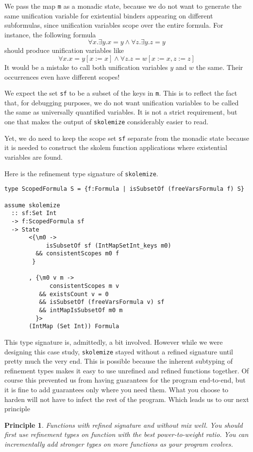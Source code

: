 \documentclass[sigconf, review]{acmart}
\newcommand{\tc}[1]{{\small\texttt{#1}}}
\newtheorem{principle}{Principle}
\begin{document}
We pass the map \tc{m} as a monadic state, because we do not
want to generate the same unification variable for existential binders appearing
on different subformulas, since unification variables scope over the entire formula. For instance, the following formula
$$\forall x. \exists y. x = y \land \forall z. \exists y. z = y$$
should produce unification variables like
$$\forall x. x = y[x:=x] \land \forall z. z = w[x:=x, z:=z]$$
It would be a mistake to call both unification variables $y$ and $w$ the same.
Their occurrences even have different scopes!

We expect the set \tc{sf} to be a subset of the keys in \tc{m}. This is to reflect the
fact that, for debugging purposes, we do not want unification variables to be called the same as
universally quantified variables. It is not a strict requirement, but one
that makes the output of \tc{skolemize} considerably easier to read.

Yet, we do need to keep the scope set \tc{sf} separate from the monadic
state because it is needed to construct the skolem function applications where
existential variables are found.

Here is the refinement type signature of \tc{skolemize}.
\begin{verbatim}
type ScopedFormula S = {f:Formula | isSubsetOf (freeVarsFormula f) S}

assume skolemize
  :: sf:Set Int
  -> f:ScopedFormula sf
  -> State
       <{\m0 ->
            isSubsetOf sf (IntMapSetInt_keys m0)
         && consistentScopes m0 f
        }

       , {\m0 v m ->
             consistentScopes m v
          && existsCount v = 0
          && isSubsetOf (freeVarsFormula v) sf
          && intMapIsSubsetOf m0 m
         }>
       (IntMap (Set Int)) Formula
\end{verbatim}

This type signature is, admittedly, a bit involved. However while we were
designing this case study, \tc{skolemize} stayed without a refined signature
until pretty much the very end. This is possible because the inherent subtyping
of refinement types makes it easy to use unrefined and refined functions together.
Of course this prevented us from having guarantees for the program end-to-end,
but it is fine to add guarantees only where you need them. What you choose
to harden will not have to infect the rest of the program.
Which leads us to our next principle

\begin{principle}
  Functions with refined signature and without mix well. You should first use
  refinement types on function with the best power-to-weight ratio. You can
  incrementally add stronger types on more functions as your program evolves.
\end{principle}
\end{document}
